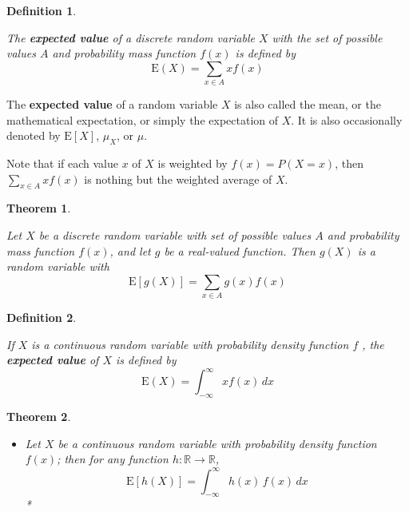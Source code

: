 \documentclass[landscape, 20pt]{extreport}
\providecommand{\tightlist}{%
  \setlength{\itemsep}{0pt}\setlength{\parskip}{0pt}}
\newtheorem{theorem}{Theorem}[chapter]
\theoremstyle{definition}
\newtheorem{definition}{Definition}[chapter]
\theoremstyle{definition}
\theoremstyle{definition}
\theoremstyle{definition}
\theoremstyle{remark}
\begin{document}
\begin{definition}
\protect\hypertarget{def:unlabeled-div-5}{}\label{def:unlabeled-div-5}

\emph{The \textbf{expected value} of a discrete random variable
\(X\) with the set of possible values \(A\) and probability mass function
\(f(x)\) is defined by \[\mathrm{E}(X) = \sum_{x \in A} x f(x)\]}

\end{definition}

The \textbf{expected value} of a random variable \(X\) is also called the mean,
or the mathematical expectation, or simply the expectation of \(X\). It is
also occasionally denoted by \(\mathrm{E}[X]\), \(\mu_X\), or \(\mu\).

Note that if each value \(x\) of \(X\) is weighted by \(f(x) = P(X = x)\),
then \(\displaystyle \sum_{x \in A} x f(x)\) is nothing but the weighted
average of \(X\).

\begin{theorem}
\protect\hypertarget{thm:unlabeled-div-6}{}\label{thm:unlabeled-div-6}

\emph{Let \(X\) be a discrete random variable with set of
possible values \(A\) and probability mass function \(f(x)\), and let \(g\) be
a real-valued function. Then \(g(X)\) is a random variable with
\[\mathrm{E}[g(X)] = \sum_{x \in A} g(x) f(x)\] }

\end{theorem}

\begin{definition}
\protect\hypertarget{def:unlabeled-div-7}{}\label{def:unlabeled-div-7}

\emph{If \(X\) is a continuous random variable with
probability density function \(f\) , the \textbf{expected value} of \(X\) is
defined by \[\mathrm{E}(X) = \int_{-\infty}^\infty x f(x)\, dx\] }

\end{definition}

\begin{theorem}
\protect\hypertarget{thm:unlabeled-div-8}{}\label{thm:unlabeled-div-8}

\begin{itemize}
\tightlist
\item
  Let \(X\) be a continuous random variable with
  probability density function \(f (x)\); then for any function
  \(h: \mathbb{R} \rightarrow \mathbb{R}\),
  \[\mathrm{E}[h(X)] = \int_{-\infty}^\infty h(x)\, f(x)\, dx\] *
\end{itemize}

\end{theorem}
\end{document}
